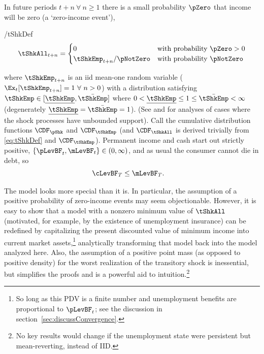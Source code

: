 \documentclass[BufferStockTheory]{subfiles}
\begin{document}
In future periods $t+n ~\forall~ n \geq 1$ there is a small probability $\pZero$ that income will
be zero (a `zero-income event'),
\begin{verbatimwrite}{\EqDir/tShkDef}
  \begin{equation}
    \tShkAll _{t+n}=
    \begin{cases}
      0\phantom{_{t+1}/\pNotZero} & \text{with probability $\pZero>0$} \\
      \tShkEmp_{t+n}/\pNotZero      & \text{with probability $\pNotZero  $} %
    \end{cases} \label{eq:tShkDef}
  \end{equation}
\end{verbatimwrite}

where $\tShkEmp_{t+n}$ is an iid mean-one random variable
($\Ex_{t}[{\tShkEmp}_{t+n}]=1~\forall~n>0$)
with a distribution
satisfying $\tShkEmp \in \lbrack \underline{\tShkEmp},\bar{\tShkEmp}\rbrack$
where $0<\underline{\tShkEmp} \leq 1 \leq \bar{\tShkEmp}<\infty$
(degenerately $\underline{\tShkEmp}=\bar{\tShkEmp}=1$). (See \cite{rabaultBorrowing} and \cite{lsIncFluct} for analyses of cases where the shock processes have unbounded support).  Call the cumulative
distribution functions $\CDF_{\pShk}$ and $\CDF_{\tShkEmp}$ (and $\CDF_{\tShkAll}$
is derived trivially from \eqref{eq:tShkDef} and $\CDF_{\tShkEmp}$).
Permanent income and cash start out strictly positive, $\{\pLevBF_{t},\mLevBF_{t}\} \in
(0,\infty)$, and as usual the consumer cannot die in
debt, so
\begin{equation}\begin{gathered}\begin{aligned}
  \cLevBF_{T} & \leq  \mLevBF_{T} \label{eq:NoDebtAtDeath}.
\end{aligned}\end{gathered}\end{equation}

\hypertarget{PDV}{}
The model looks more special than it is.  In particular, the
assumption of a positive probability of zero-income events may seem
objectionable.  However, it is easy to show that a model with a
nonzero minimum value of $\tShkAll$ (motivated, for example, by the
existence of unemployment insurance) can be redefined by capitalizing
the present discounted value of minimum income into current market assets,\footnote{So long
  as this PDV is a finite number and unemployment benefits are
  proportional to $\pLevBF_{t}$; see the discussion in
  section~\ref{sec:discussConvergence}.}  analytically transforming
that model back into the model analyzed here.  Also, the assumption of
a positive point mass (as opposed to positive density) for the worst
realization of the transitory shock is inessential, but simplifies the proofs and is a powerful aid to intuition.\footnote{No key results would change if the unemployment state were persistent but mean-reverting, instead of IID.}
\end{document}
